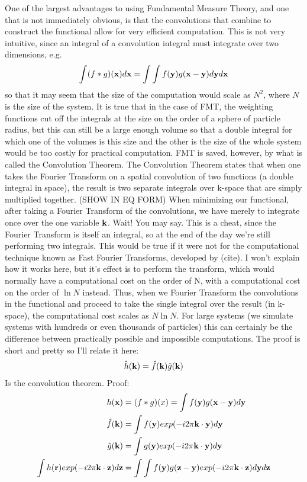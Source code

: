 One of the largest advantages to using Fundamental Measure Theory, and
one that is not immediately obvious, is that the convolutions that
combine to construct the functional allow for very efficient
computation.  This is not very intuitive, since an integral of a
convolution integral must integrate over two dimensions, e.g.
\begin{align}
\int(f\ast g)(\textbf{x})d\textbf{x} = \int \int f(\textbf{y})g(\textbf{x}-\textbf{y})d\textbf{y} d\textbf{x}
\end{align}
so that it may seem that the size of the computation would scale as
$N^2$, where $N$ is the size of the system.  It is true that in the
case of FMT, the weighting functions cut off the integrals at the size
on the order of a sphere of particle radius, but this can still be a
large enough volume so that a double integral for which one of the
volumes is this size and the other is the size of the whole system
would be too costly for practical computation.  FMT is saved, however,
by what is called the Convolution Theorem.  The Convolution Theorem
states that when one takes the Fourier Transform on a spatial
convolution of two functions (a double integral in space), the result
is two separate integrals over k-space that are simply multiplied
together.  (SHOW IN EQ FORM) When minimizing our functional, after
taking a Fourier Transform of the convolutions, we have merely to
integrate once over the one variable $\textbf{k}$.  Wait!  You may say.  This
is a cheat, since the Fourier Transform is itself an integral, so at
the end of the day we're still performing two integrals.  This would
be true if it were not for the computational technique known as Fast
Fourier Transforms, developed by (cite).  I won't explain how it works
here, but it's effect is to perform the transform, which would
normally have a computational cost on the order of N, with a
computational cost on the order of $\ln N$ instead.  Thus, when we
Fourier Transform the convolutions in the functional and proceed to
take the single integral over the result (in k-space), the
computational cost scales as $N \ln N$.  For large systems (we
simulate systems with hundreds or even thousands of particles) this
can certainly be the difference between practically possible and
impossible computations.  The proof is short and pretty so I'll relate
it here:
\begin{align}
\hat{h}(\textbf{k}) = \hat{f}(\textbf{k})\hat{g}(\textbf{k})
\end{align}
Is the convolution theorem.  Proof:
\begin{align}
h(\textbf{x}) &= (f\ast g)(x) = \int f(\textbf{y})g(\textbf{x}-\textbf{y})d\textbf{y} \\
\hat{f}(\textbf{k}) &= \int f(\textbf{y}) exp(-i2\pi \textbf{k} \cdot \textbf{y})d\textbf{y} \\
\hat{g}(\textbf{k}) &= \int g(\textbf{y}) exp(-i2\pi \textbf{k} \cdot \textbf{y})d\textbf{y} \\
\int h(\textbf{r}) exp(-i2\pi \textbf{k} \cdot \textbf{z}) d\textbf{z} &= \int \int f(\textbf{y}) g(\textbf{z}-\textbf{y}) exp(-i2\pi \textbf{k} \cdot \textbf{z}) d\textbf{y} d\textbf{z}
\end{align}
